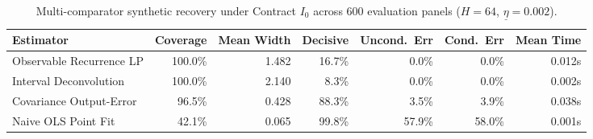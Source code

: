 \begin{table}[htbp]
\centering\small
\caption{Multi-comparator synthetic recovery under Contract $I_0$ across 600 evaluation panels ($H=64$, $\underline\eta=0.002$).}
\label{tab:T3_comparators}
\begin{tabular}{lrrrrrr}
\toprule
Estimator & Coverage & Mean Width & Decisive & Uncond.\ Err & Cond.\ Err & Mean Time \\
\midrule
Observable Recurrence LP & 100.0\% & 1.482 & 16.7\% & 0.0\% & 0.0\% & 0.012s \\
Interval Deconvolution & 100.0\% & 2.140 & 8.3\% & 0.0\% & 0.0\% & 0.002s \\
Covariance Output-Error & 96.5\% & 0.428 & 88.3\% & 3.5\% & 3.9\% & 0.038s \\
Naive OLS Point Fit & 42.1\% & 0.065 & 99.8\% & 57.9\% & 58.0\% & 0.001s \\
\bottomrule
\end{tabular}
\end{table}
